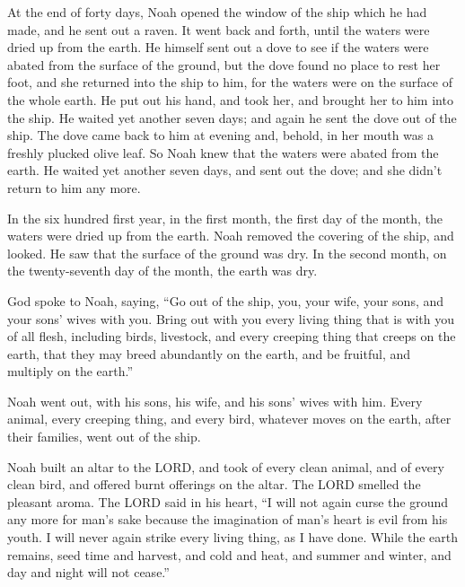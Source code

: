 \myverse{}At the end of forty days, Noah opened the window of the ship which he had made, \myverse{}and he sent out a raven. It went back and forth, until the waters were dried up from the earth. \myverse{}He himself sent out a dove to see if the waters were abated from the surface of the ground, \myverse{}but the dove found no place to rest her foot, and she returned into the ship to him, for the waters were on the surface of the whole earth. He put out his hand, and took her, and brought her to him into the ship. \myverse{} He waited yet another seven days; and again he sent the dove out of the ship.  \myverse{}The dove came back to him at evening and, behold, in her mouth was a freshly plucked olive leaf. So Noah knew that the waters were abated from the earth. \myverse{}He waited yet another seven days, and sent out the dove; and she didn’t return to him any more.

\myverse{}In the six hundred first year, in the first month, the first day of the month, the waters were dried up from the earth. Noah removed the covering of the ship, and looked. He saw that the surface of the ground was dry. \myverse{}In the second month, on the twenty-seventh day of the month, the earth was dry.

\myverse{}God spoke to Noah, saying, \myverse{}“Go out of the ship, you, your wife, your sons, and your sons’ wives with you. \myverse{}Bring out with you every living thing that is with you of all flesh, including birds, livestock, and every creeping thing that creeps on the earth, that they may breed abundantly on the earth, and be fruitful, and multiply on the earth.”

\myverse{}Noah went out, with his sons, his wife, and his sons’ wives with him. \myverse{}Every animal, every creeping thing, and every bird, whatever moves on the earth, after their families, went out of the ship.

\myverse{}Noah built an altar to the LORD, and took of every clean animal, and of every clean bird, and offered burnt offerings on the altar.  \myverse{}The LORD smelled the pleasant aroma. The LORD said in his heart, “I will not again curse the ground any more for man’s sake because the imagination of man’s heart is evil from his youth. I will never again strike every living thing, as I have done. \myverse{}While the earth remains, seed time and harvest, and cold and heat, and summer and winter, and day and night will not cease.”

